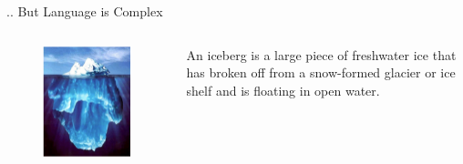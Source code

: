 \begin{frame}[allowframebreaks]{.. But Language is Complex}
\begin{columns}
    \begin{column}{0.55\textwidth}
        \begin{figure}
            \centering
            \includegraphics[height=0.9\textheight, width=\textwidth, keepaspectratio]{images/nlp/intro_slide_5_1_img.png}
        \end{figure}
    \end{column}
    \begin{column}{0.45\textwidth}
        An iceberg is a large piece of freshwater ice that has broken off
        from a snow-formed glacier or ice shelf and is floating in open
        water.
    \end{column}
\end{columns}
\end{frame}

